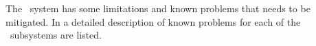 The \appName\ system has some limitations and known problems that needs to be
mitigated. 
In  a detailed
description of known problems for each of the \appName\ subsystems are listed.

